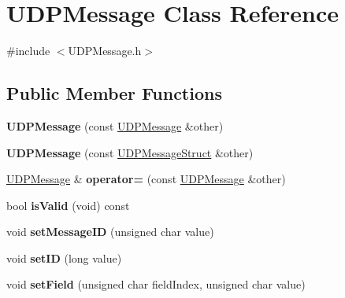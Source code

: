 \hypertarget{class_u_d_p_message}{}\section{U\+D\+P\+Message Class Reference}
\label{class_u_d_p_message}


{\ttfamily \#include $<$U\+D\+P\+Message.\+h$>$}

\subsection*{Public Member Functions}
\begin{DoxyCompactItemize}
\item 
\mbox{\label{class_u_d_p_message_adbc0139ef0249efd4a932bbc0b57fe13}} 
{\bfseries U\+D\+P\+Message} (const \hyperlink{class_u_d_p_message}{U\+D\+P\+Message} \&other)
\item 
\mbox{\label{class_u_d_p_message_a6edf87f4f8f441edf2064d5f6fa5cd02}} 
{\bfseries U\+D\+P\+Message} (const \hyperlink{struct_u_d_p_message_struct}{U\+D\+P\+Message\+Struct} \&other)
\item 
\mbox{\label{class_u_d_p_message_af3bb7f16fec948bcfbf99646b79c5c58}} 
\hyperlink{class_u_d_p_message}{U\+D\+P\+Message} \& {\bfseries operator=} (const \hyperlink{class_u_d_p_message}{U\+D\+P\+Message} \&other)
\item 
\mbox{\label{class_u_d_p_message_ad732ecdc07825ce944b251b0e8f55e90}} 
bool {\bfseries is\+Valid} (void) const
\item 
\mbox{\label{class_u_d_p_message_aba4aadebe7b1aa92ba558f3cd4319e79}} 
void {\bfseries set\+Message\+ID} (unsigned char value)
\item 
\mbox{\label{class_u_d_p_message_a2fcacc64fbb5598848a391c9fd9aa8c2}} 
void {\bfseries set\+ID} (long value)
\item 
\mbox{\label{class_u_d_p_message_ad7f1c729cf357be18e6cda695f5e5d99}} 
void {\bfseries set\+Field} (unsigned char field\+Index, unsigned char value)
\item 

\end{DoxyCompactItemize}
